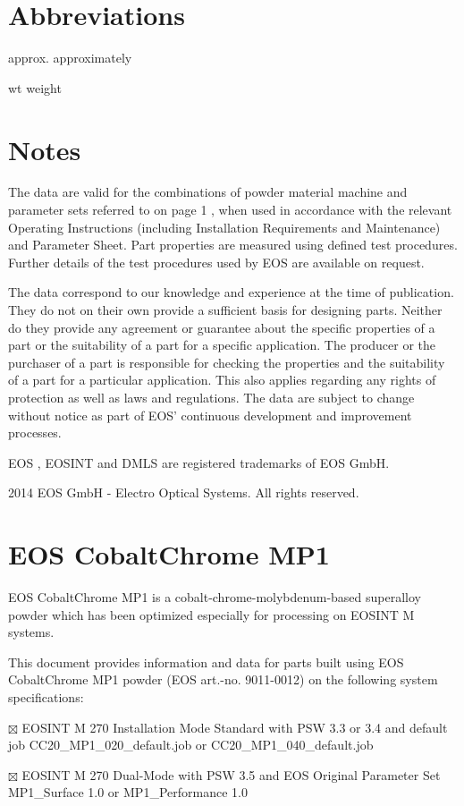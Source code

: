 \documentclass[10pt]{article}
\begin{document}
\section*{Abbreviations}
approx. approximately

wt weight

\section*{Notes}
The data are valid for the combinations of powder material machine and parameter sets referred to on page 1 , when used in accordance with the relevant Operating Instructions (including Installation Requirements and Maintenance) and Parameter Sheet. Part properties are measured using defined test procedures. Further details of the test procedures used by EOS are available on request.

The data correspond to our knowledge and experience at the time of publication. They do not on their own provide a sufficient basis for designing parts. Neither do they provide any agreement or guarantee about the specific properties of a part or the suitability of a part for a specific application. The producer or the purchaser of a part is responsible for checking the properties and the suitability of a part for a particular application. This also applies regarding any rights of protection as well as laws and regulations. The data are subject to change without notice as part of EOS' continuous development and improvement processes.

EOS , EOSINT and DMLS are registered trademarks of EOS GmbH.

2014 EOS GmbH - Electro Optical Systems. All rights reserved.

\section*{EOS CobaltChrome MP1}
EOS CobaltChrome MP1 is a cobalt-chrome-molybdenum-based superalloy powder which has been optimized especially for processing on EOSINT M systems.

This document provides information and data for parts built using EOS CobaltChrome MP1 powder (EOS art.-no. 9011-0012) on the following system specifications:

$\boxtimes$ EOSINT M 270 Installation Mode Standard with PSW 3.3 or 3.4 and default job CC20\_MP1\_020\_default.job or CC20\_MP1\_040\_default.job

$\boxtimes$ EOSINT M 270 Dual-Mode with PSW 3.5 and EOS Original Parameter Set MP1\_Surface 1.0 or MP1\_Performance 1.0
\end{document}
